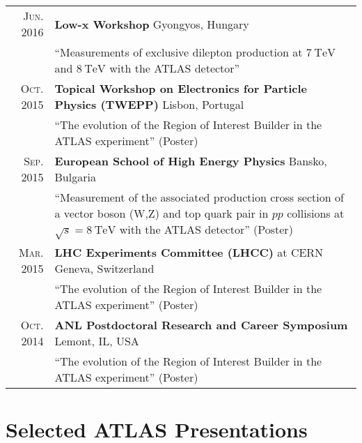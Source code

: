 \documentclass[a4paper,10pt]{article}
\begin{document}
\begin{tabular}{rp{15.5cm}}
\textsc{Jun. 2016}		& {\bf Low-x Workshop} \hfill Gyongyos, Hungary \\
						& ``Measurements of exclusive dilepton production at $7\ \mathrm{TeV}$ and $8\ \mathrm{TeV}$ with the ATLAS detector'' \\
\textsc{Oct. 2015}		& {\bf Topical Workshop on Electronics for Particle Physics (TWEPP)} \hfill Lisbon, Portugal \\
						& ``The evolution of the Region of Interest Builder in the ATLAS experiment''  (Poster)\\
\textsc{Sep. 2015}		& {\bf European School of High Energy Physics} \hfill Bansko, Bulgaria\\
						& ``Measurement of the associated production cross section of a vector boson (W,Z) and top quark pair in $pp$ collisions at $\sqrt{s} = 8\ \mathrm{TeV}$ with the ATLAS detector'' (Poster)\\
\textsc{Mar. 2015}		& {\bf LHC Experiments Committee (LHCC)} at CERN \hfill Geneva, Switzerland  \\
						& ``The evolution of the Region of Interest Builder in the ATLAS experiment''  (Poster)\\
\textsc{Oct. 2014}		& {\bf ANL Postdoctoral Research and Career Symposium} \hfill Lemont, IL, USA  \\
						& ``The evolution of the Region of Interest Builder in the ATLAS experiment''  (Poster) \\
\end{tabular}

\vspace{3mm}
\section{Selected ATLAS Presentations}
\end{document}
